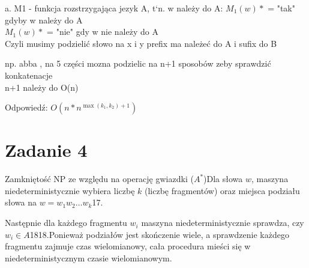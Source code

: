 \documentclass{article}
\begin{document}
a. M1 - funkcja rozstrzygająca jezyk A, t`n. w należy do A:
$M_1(w)*$ = "tak" gdyby w należy do A \\
$M_1(w)*$ = "nie" gdy w nie należy do A  \\

Czyli musimy podzielić słowo na x i y prefix ma należeć do A i sufix do B

np. abba , na 5 części mozna podzielic na n+1 sposobów zeby sprawdzić konkatenacje \\
n+1 należy do O(n)

Odpowiedź: $O\!\left(n*n^{\max(k_1, k_2)+1}\right)$ \\

\section{Zadanie 4}
Zamkniętość NP ze względu na operację gwiazdki ($A^*$)Dla słowa $w$, maszyna niedeterministycznie wybiera liczbę $k$ (liczbę fragmentów) oraz miejsca podziału słowa na $w = w_1 w_2 \dots w_k$17.

Następnie dla każdego fragmentu $w_i$ maszyna niedeterministycznie sprawdza, czy $w_i \in A$1818.Ponieważ podziałów jest skończenie wiele, a sprawdzenie każdego fragmentu zajmuje czas wielomianowy, cała procedura mieści się w niedeterministycznym czasie wielomianowym.
\end{document}
